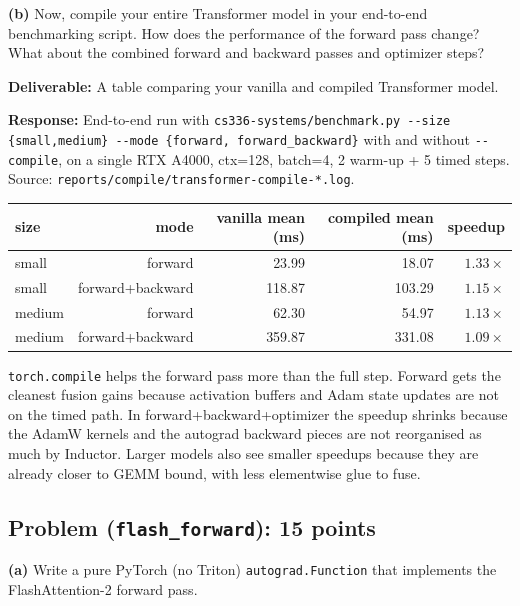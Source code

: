 \documentclass[11pt]{article}
\begin{document}
\vspace{0.25cm}
\textbf{(b)} Now, compile your entire Transformer model in your end-to-end benchmarking script. How does the performance of the forward pass change? What about the combined forward and backward passes and optimizer steps?

\textbf{Deliverable:} A table comparing your vanilla and compiled Transformer model.

\vspace{0.25cm}
\textbf{Response:}
End-to-end run with \verb|cs336-systems/benchmark.py --size {small,medium} --mode {forward, forward_backward}| with and without \verb|--compile|, on a single RTX A4000, ctx=128, batch=4, 2 warm-up + 5 timed steps. Source: \verb|reports/compile/transformer-compile-*.log|.

\begin{table}[H]
\centering\small
\begin{tabular}{lrrrr}
\toprule
size  & mode             & vanilla mean (ms) & compiled mean (ms) & speedup \\
\midrule
small  & forward          &  23.99 &  18.07 & $1.33\times$ \\
small  & forward+backward & 118.87 & 103.29 & $1.15\times$ \\
medium & forward          &  62.30 &  54.97 & $1.13\times$ \\
medium & forward+backward & 359.87 & 331.08 & $1.09\times$ \\
\bottomrule
\end{tabular}
\end{table}

\noindent \texttt{torch.compile} helps the forward pass more than the full step. Forward gets the cleanest fusion gains because activation buffers and Adam state updates are not on the timed path. In forward+backward+optimizer the speedup shrinks because the AdamW kernels and the autograd backward pieces are not reorganised as much by Inductor. Larger models also see smaller speedups because they are already closer to GEMM bound, with less elementwise glue to fuse.

\subsection*{Problem (\texttt{flash\_forward}): 15 points}

\textbf{(a)} Write a pure PyTorch (no Triton) \texttt{autograd.Function} that implements the FlashAttention-2 forward pass.
\end{document}
